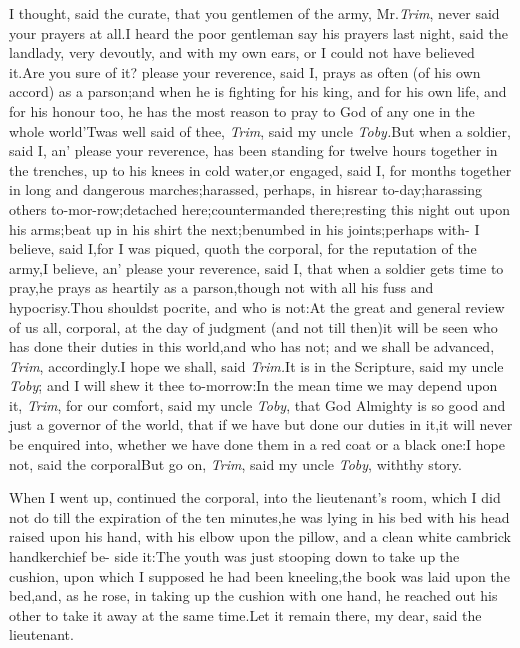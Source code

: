 \documentclass{article}
\begin{document}
I thought, said the curate, that you gentlemen of
the army, Mr.\@ \textit{Trim}, never said your prayers at all.\tsh I heard
the poor gentleman say his prayers last night, said the landlady,
very devoutly, and with my own ears, or I could not have believed
it.\tsh Are you sure of it? 
please your reverence,
said I, prays as often (of his own accord) as a
parson;\break\tsh and when he is fighting for his king, and for
his own life, and for his honour too, he has the most reason to
pray to God of any one in the whole world\tsh ’Twas
well said of thee, \textit{Trim}, said my uncle
\textit{Toby.}\tsh But when a soldier, said I, an’
please your reverence, has been standing for twelve hours together
in the trenches, up to his knees in cold water,\tsk or engaged,
said I, for months together in long and dangerous
marches;\tsk harassed, perhaps, in his\break rear
to-day;\tsk harassing others to-mor-\break row;\tsk detached
here;\tsk countermanded there;\tsk resting this night out upon
his arms;\tsk beat up in his shirt the next;\tsk benumbed in
his joints;\tsk perhaps with-
I believe, said I,\tsk for I was piqued,\break
quoth the corporal, for the reputation of the army,\tsk I believe,
an’ please your reverence, said I, that when a soldier gets
time to pray,\tsk he prays as heartily as a parson,\tsk though
not with all his fuss and hypocrisy.\tsh Thou shouldst 
pocrite, and who is not:\tsh At
the great and general review of us all, corporal, at the day of
judgment (and not till then)\tsk it will be seen who has done
their duties in this world,\tsk and who has not; and we shall be
advanced, \textit{Trim}, accordingly.\tsh I hope we shall,
said \textit{Trim.}\tsh It is in the Scripture, said my
uncle \textit{Toby}; and I will shew it thee to-morrow:\tsh In the
mean time we may depend upon it, \textit{Trim}, for our comfort, said
my uncle \textit{Toby}, that God Almighty is so good and just a
governor of the world, that if we have but done our duties in
it,\tsh it will never be enquired into, whether we have done them
in a red coat or a black one:\tsh\break I hope not, said the
corporal\tsh But go on, \textit{Trim}, said my uncle
\textit{Toby}, with\break thy story.

When I went up, continued the corporal, into the
lieutenant’s room, which I did not do till the expiration of
the ten minutes,\tsk he was lying in his bed with his
head raised upon his hand, with his elbow upon the pillow, and a
clean white cambrick handkerchief be- side it:\tsh The youth
was just stooping down to take up the cushion, upon which I
supposed he had been kneeling,\tsk the book was laid upon the
bed,\tsk and, as he rose, in taking up the cushion with one hand,
he reached out his other to take it away at the same
time.\tsh Let it remain there, my dear, said the
lieutenant.
\end{document}
